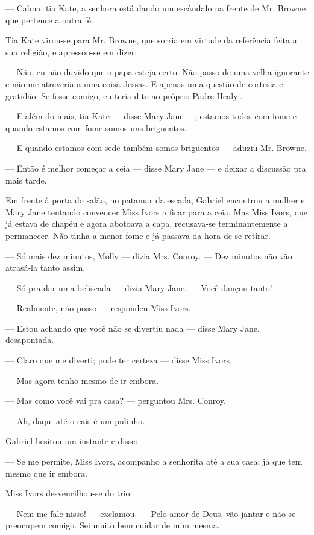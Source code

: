 --- Calma, tia Kate, a senhora está dando um escândalo na frente de
Mr. Browne que pertence a outra fé.

Tia Kate virou-se para Mr. Browne, que sorria em virtude da referência
feita a sua religião, e apressou-se em dizer:

--- Não, eu não duvido que o papa esteja certo. Não passo de uma velha
ignorante e não me atreveria a uma coisa dessas. E apenas uma questão
de cortesia e gratidão. Se fosse comigo, eu teria dito ao próprio
Padre Healy\ldots{}

--- E além do mais, tia Kate --- disse Mary Jane ---, estamos todos
com fome e quando estamos com fome somos uns briguentos.

--- E quando estamos com sede também somos briguentos --- aduziu Mr.
Browne.

--- Então é melhor começar a ceia --- disse Mary Jane --- e deixar a
discussão pra mais tarde.

Em frente à porta do salão, no patamar da escada, Gabriel encontrou a
mulher e Mary Jane tentando convencer Miss Ivors a ficar para a ceia.
Mas Miss Ivors, que já estava de chapéu e agora abotoava a capa,
recusava-se terminantemente a permanecer. Não tinha a menor fome e já
passava da hora de se retirar.

--- Só mais dez minutos, Molly --- dizia Mrs. Conroy. --- Dez minutos
não vão atrasá-la tanto assim.

--- Só pra dar uma beliscada --- dizia Mary Jane. --- Você dançou
tanto!

--- Realmente, não posso --- respondeu Miss Ivors.

--- Estou achando que você não se divertiu nada --- disse Mary Jane,
desapontada.

--- Claro que me diverti; pode ter certeza --- disse Miss Ivors.

--- Mas agora tenho mesmo de ir embora.

--- Mas como você vai pra casa? --- perguntou Mrs. Conroy.

--- Ah, daqui até o cais é um pulinho.

Gabriel hesitou um instante e disse:

--- Se me permite, Miss Ivors, acompanho a senhorita até a sua casa;
já que tem mesmo que ir embora.

Miss Ivors desvencilhou-se do trio.

--- Nem me fale nisso! --- exclamou. --- Pelo amor de Deus, vão jantar
e não se preocupem comigo. Sei muito bem cuidar de mim mesma.

